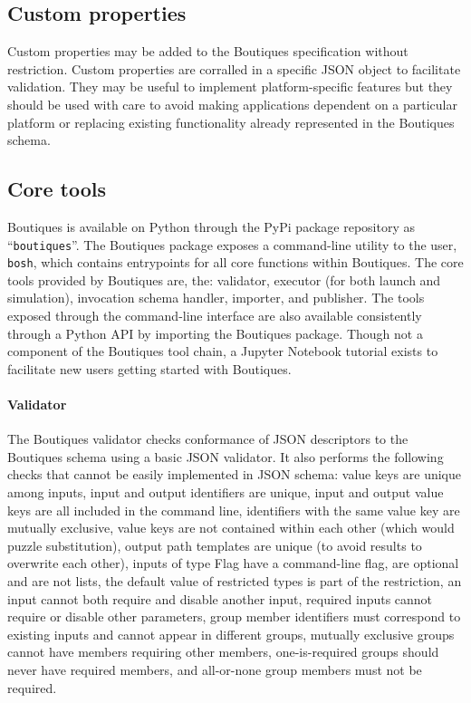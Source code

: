 \documentclass[a4paper,num-refs]{oup-contemporary}
\newcommand{\boutiques}{Boutiques\xspace}
\begin{document}
\subsection{Custom properties}

Custom properties may be added to the Boutiques specification without
restriction. Custom properties are corralled in a specific JSON object
to facilitate validation. They may be useful to implement
platform-specific features but they should be used with care to avoid
making applications dependent on a particular platform or replacing
existing functionality already represented in the \boutiques schema.

\subsection{Core tools} 

\boutiques is available on Python through the PyPi package repository
as ``\texttt{boutiques}''. The \boutiques package exposes a
command-line utility to the user, \texttt{bosh}, which contains
entrypoints for all core functions within \boutiques. The core tools
provided by \boutiques are, the: validator, executor (for both launch
and simulation), invocation schema handler, importer, and
publisher. The tools exposed through the command-line interface are also
available consistently through a Python API by importing the
\boutiques package. Though not a component of the \boutiques tool
chain, a Jupyter Notebook tutorial exists to facilitate new users
getting started with \boutiques.

\paragraph{Validator} The \boutiques validator checks conformance of JSON
descriptors to the \boutiques schema using a basic JSON validator. It
also performs the following checks that cannot be easily implemented
in JSON schema: value keys are unique among inputs, input and output
identifiers are unique, input and output value keys are all included
in the command line, identifiers with the same value key are mutually
exclusive, value keys are not contained within each other (which would
puzzle substitution), output path templates are unique (to avoid
results to overwrite each other), inputs of type Flag have a
command-line flag, are optional and are not lists, the default value
of restricted types is part of the restriction, an input cannot both
require and disable another input, required inputs cannot require or
disable other parameters, group member identifiers must correspond to
existing inputs and cannot appear in different groups, mutually
exclusive groups cannot have members requiring other members,
one-is-required groups should never have required members, and
all-or-none group members must not be required.
\end{document}
